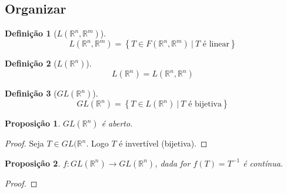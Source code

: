 \documentclass{article}
\newtheorem{prop}{Proposição}[section]
\theoremstyle{theorem}
\theoremstyle{lemma}
\theoremstyle{definition}
\newtheorem{definicao}{Definição}[section]
\theoremstyle{remark}
\begin{document}
\subsection{Organizar}
\begin{definicao}[$L(\mathbb{R}^n, \mathbb{R}^m)$]
	$$L(\mathbb{R}^n, \mathbb{R}^m) = \left\{ T \in F(\mathbb{R}^n, \mathbb{R}^m) \: | \: T \text{ é linear}\right\}$$
\end{definicao}
\begin{definicao}[$L(\mathbb{R}^n)$]
	$$L(\mathbb{R}^n) = L(\mathbb{R}^n, \mathbb{R}^n)$$
\end{definicao}
\begin{definicao}[$GL(\mathbb{R}^n)$]
	$$GL(\mathbb{R}^n) = \left\{ T \in L(\mathbb{R}^n) \: | \: T \text{ é bijetiva}\right\}$$
\end{definicao}
\begin{prop}
	$GL(\mathbb{R}^n)$ é aberto.
\end{prop}
\begin{proof}
	Seja $T\in GL(\mathbb{R}^n$. Logo $T$ é  invertível (bijetiva). 
\end{proof}
\begin{prop}
	$f:GL(\mathbb{R}^n) \to GL(\mathbb{R}^n)$, dada for $f(T) = T^{-1}$ é contínua.
\end{prop}
\begin{proof}
\end{proof}
\end{document}
